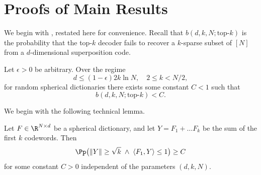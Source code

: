\section{Proofs of Main Results \label{appendix:proofs}}

We begin with , restated here for convenience. Recall that $b(d, k, N; \text{top-}k)$ is the probability that the top-$k$ decoder fails to recover a $k$-sparse subset of $[N]$ from a $d$-dimensional superposition code.

\begin{proposition*}
    Let $\epsilon > 0$ be arbitrary. Over the regime
    $$
    d \le (1 - \epsilon) 2 k \ln N, \quad 2 \le k < N/2,
    $$
    for random spherical dictionaries there exists some constant $C < 1$ such that
    $$
    b(d, k, N; \text{top-$k$}) < C.
    $$
\end{proposition*}

We begin with the following technical lemma.

\begin{lemma}
    Let $F \in \R^{N \times d}$ be a spherical dictionary, and let $Y = F_1 + \dots F_k$ be the sum of the first $k$ codewords. Then
    $$
    \Pp\bigl(\lVert Y \rVert \ge \sqrt{k} \; \land \; \langle F_1, Y \rangle \le 1\bigr) \ge C
    $$
    for some constant $C > 0$ independent of the parameters $(d, k, N).$
\end{lemma}

